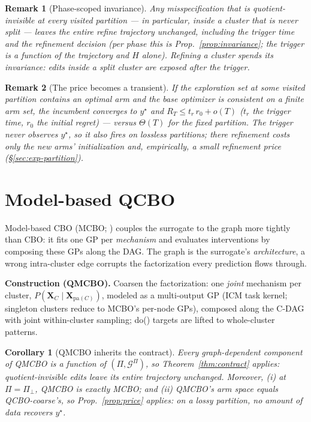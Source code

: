 \documentclass[twoside]{article}
\newtheorem{corollary}{Corollary}
\newtheorem{remark}{Remark}
\newcommand{\QCBO}{\textsc{QCBO}}
\newcommand{\QMCBO}{\textsc{QMCBO}}
\newcommand{\CBO}{\textsc{CBO}}
\newcommand{\Gq}{\mathcal{G}^{\Pi}}
\begin{document}
\begin{remark}[Phase-scoped invariance]
\label{rem:phase_invariance}
Any misspecification that is quotient-invisible at \emph{every} visited partition --- in particular, inside a cluster that is never split --- leaves the entire refine trajectory unchanged, including the trigger time and the refinement decision (per phase this is Prop.~\ref{prop:invariance}; the trigger is a function of the trajectory and $H$ alone). Refining a cluster \emph{spends} its invariance: edits inside a split cluster are exposed after the trigger.
\end{remark}

\begin{remark}[The price becomes a transient]
\label{rem:regret}
If the exploration set at some visited partition contains an optimal arm and the base optimizer is consistent on a finite arm set, the incumbent converges to $y^\star$ and $R_T \le t_r\,r_0 + o(T)$ ($t_r$ the trigger time, $r_0$ the initial regret) --- versus $\Theta(T)$ for the fixed partition. The trigger never observes $y^\star$, so it also fires on lossless partitions; there refinement costs only the new arms' initialization and, empirically, a small refinement price (\S\ref{sec:exp-partition}).
\end{remark}

\section{Model-based \QCBO{}}
\label{sec:qmcbo}
Model-based \CBO{} (MCBO; \citealp{sussex2023model}) couples the surrogate to the graph more tightly than \CBO{}: it fits one GP per \emph{mechanism} and evaluates interventions by composing these GPs along the DAG. The graph is the surrogate's \emph{architecture}, a wrong intra-cluster edge corrupts the factorization every prediction flows through.

\textbf{Construction (\QMCBO{}).} Coarsen the factorization: one \emph{joint} mechanism per cluster, $P(\mathbf{X}_C \mid \mathbf{X}_{\mathrm{pa}(C)})$, modeled as a multi-output GP (ICM task kernel; singleton clusters reduce to MCBO's per-node GPs), composed along the C-DAG with joint within-cluster sampling; do() targets are lifted to whole-cluster patterns. 

\begin{corollary}[\QMCBO{} inherits the contract]
\label{cor:qmcbo_invariance}
Every graph-dependent component of \QMCBO{} is a function of $(\Pi,\Gq)$, so Theorem~\ref{thm:contract} applies: quotient-invisible edits leave its entire trajectory unchanged. Moreover, (i) at $\Pi=\Pi_\bot$, \QMCBO{} is exactly MCBO; and (ii) \QMCBO{}'s arm space equals \QCBO{}-coarse's, so Prop.~\ref{prop:price} applies: on a lossy partition, no amount of data recovers $y^\star$.
\end{corollary}
\end{document}
